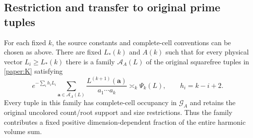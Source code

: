 \subsection{Restriction and transfer to original prime tuples}

\begin{theorem}
\label{fp:thm:arithmetic-family}
For each fixed $k$, the source constants and complete-cell conventions
can be chosen as above. There are fixed $L_*(k)$ and $A(k)$ such
that for every physical vector $L_i\ge L_*(k)$ there is a family
$\mathcal A_A(L)$ of the original squarefree tuples in
\eqref{paper:K} satisfying
\begin{equation}
 e^{-\sum_i h_iL_i}
 \sum_{\mathbf a\in\mathcal A_A(L)}
       \frac{L^{(k+1)}(\mathbf a)}{a_1\cdots a_k}
       \asymp_k\Psi_k(L),\qquad h_i=k-i+2.
 \label{fp:eq:arithmetic-family}
\end{equation}
Every tuple in this family has complete-cell occupancy in
$\mathcal G_A$ and retains the original uncolored count/root support
and size restrictions. Thus the family contributes a fixed positive
dimension-dependent fraction of the entire harmonic volume sum.
\end{theorem}
